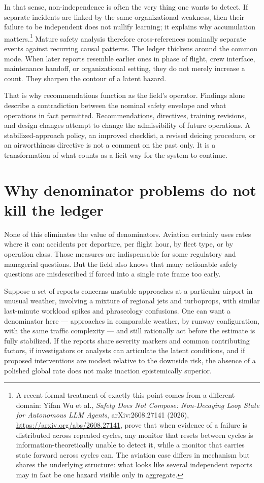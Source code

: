 \documentclass[11pt]{article}
\begin{document}
In that sense, non-independence is often the very thing one wants to detect. If separate incidents are linked by the same organizational weakness, then their failure to be independent does not nullify learning; it explains why accumulation matters.\footnote{A recent formal treatment of exactly this point comes from a different domain: Yifan Wu et al., \emph{Safety Does Not Compose: Non-Decaying Loop State for Autonomous LLM Agents}, arXiv:2608.27141 (2026), \url{https://arxiv.org/abs/2608.27141}, prove that when evidence of a failure is distributed across repeated cycles, any monitor that resets between cycles is information-theoretically unable to detect it, while a monitor that carries state forward across cycles can. The aviation case differs in mechanism but shares the underlying structure: what looks like several independent reports may in fact be one hazard visible only in aggregate.} Mature safety analysis therefore cross-references nominally separate events against recurring causal patterns. The ledger thickens around the common mode. When later reports resemble earlier ones in phase of flight, crew interface, maintenance handoff, or organizational setting, they do not merely increase a count. They sharpen the contour of a latent hazard.

That is why recommendations function as the field's \repair{} operator. Findings alone describe a contradiction between the nominal safety envelope and what operations in fact permitted. Recommendations, directives, training revisions, and design changes attempt to change the admissibility of future operations. A stabilized-approach policy, an improved checklist, a revised deicing procedure, or an airworthiness directive is not a comment on the past only. It is a transformation of what counts as a licit way for the system to continue.

\section{Why denominator problems do not kill the ledger}
None of this eliminates the value of denominators. Aviation certainly uses rates where it can: accidents per departure, per flight hour, by fleet type, or by operation class. Those measures are indispensable for some regulatory and managerial questions. But the field also knows that many actionable safety questions are misdescribed if forced into a single rate frame too early.

Suppose a set of reports concerns unstable approaches at a particular airport in unusual weather, involving a mixture of regional jets and turboprops, with similar last-minute workload spikes and phraseology confusions. One can want a denominator here --- approaches in comparable weather, by runway configuration, with the same traffic complexity --- and still rationally act before the estimate is fully stabilized. If the reports share severity markers and common contributing factors, if investigators or analysts can articulate the latent conditions, and if proposed interventions are modest relative to the downside risk, the absence of a polished global rate does not make inaction epistemically superior.
\end{document}

